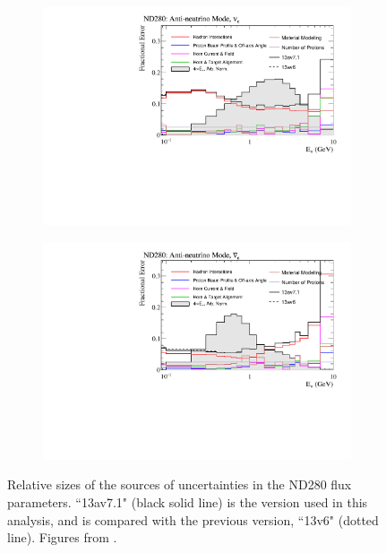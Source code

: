 \begin{figure}
\begin{subfigure}{.49\textwidth}
\end{subfigure}
\begin{subfigure}{.49\textwidth}
  \centering
  \includegraphics[width=0.99\linewidth]{figs/flux_error_t2k_nd5_rhc_nue}
\end{subfigure}
\begin{subfigure}{.49\textwidth}
  \centering
  \includegraphics[width=0.99\linewidth]{figs/flux_error_t2k_nd5_rhc_nuebar}
\end{subfigure}
\caption{Relative sizes of the sources of uncertainties in the ND280 flux parameters. ``13av7.1" (black solid line) is the version used in this analysis, and is compared with the previous version, ``13v6" (dotted line). Figures from \cite{tn401}.}\label{fig:fluxsourceND}
\end{figure}

